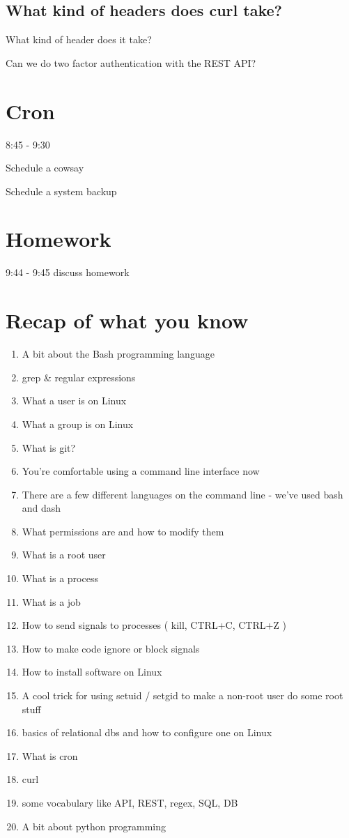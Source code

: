 \documentclass[10pt]{article}
\begin{document}
\subsection{What kind of headers does curl take?}
What kind of header does it take?

Can we do two factor authentication with the REST API?

\subsection{}

\section{Cron}
8:45 - 9:30

Schedule a cowsay

Schedule a system backup

\section{Homework}
9:44 - 9:45 discuss homework

\section{Recap of what you know}
\begin{enumerate}
\item A bit about the Bash programming language
\item grep \& regular expressions
\item What a user is on Linux
\item What a group is on Linux
\item What is git?
\item You're comfortable using a command line interface now
\item There are a few different languages on the command line - we've used bash and dash
\item What permissions are and how to modify them
\item What is a root user
\item What is a process
\item What is a job
\item How to send signals to processes ( kill, CTRL+C, CTRL+Z )
\item How to make code ignore or block signals
\item How to install software on Linux
\item A cool trick for using setuid / setgid to make a non-root user do some root stuff
\item basics of relational dbs and how to configure one on Linux
\item What is cron
\item curl
\item some vocabulary like API, REST, regex, SQL, DB
\item A bit about python programming
\end{enumerate}
\end{document}
